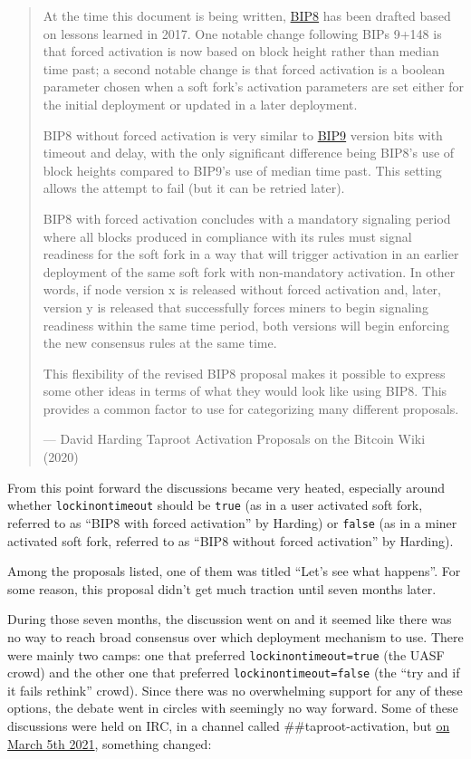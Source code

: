 \begin{quote}
At the time this document is being written,
\href{https://github.com/bitcoin/bips/blob/master/bip-0008.mediawiki}{BIP8}
has been drafted based on lessons learned in 2017. One notable change
following BIPs 9+148 is that forced activation is now based on block
height rather than median time past; a second notable change is that
forced activation is a boolean parameter chosen when a soft fork's
activation parameters are set either for the initial deployment or
updated in a later deployment.

BIP8 without forced activation is very similar to
\href{https://github.com/bitcoin/bips/blob/master/bip-0009.mediawiki}{BIP9}
version bits with timeout and delay, with the only significant
difference being BIP8's use of block heights compared to BIP9's use of
median time past. This setting allows the attempt to fail (but it can be
retried later).

BIP8 with forced activation concludes with a mandatory signaling period
where all blocks produced in compliance with its rules must signal
readiness for the soft fork in a way that will trigger activation in an
earlier deployment of the same soft fork with non-mandatory activation.
In other words, if node version x is released without forced activation
and, later, version y is released that successfully forces miners to
begin signaling readiness within the same time period, both versions
will begin enforcing the new consensus rules at the same time.

This flexibility of the revised BIP8 proposal makes it possible to
express some other ideas in terms of what they would look like using
BIP8. This provides a common factor to use for categorizing many
different proposals.

---  David Harding Taproot Activation Proposals on the Bitcoin Wiki
(2020)
\end{quote}

From this point forward the discussions became very heated, especially
around whether \texttt{lockinontimeout} should be \texttt{true} (as in a
user activated soft fork, referred to as ``BIP8 with forced activation''
by Harding) or \texttt{false} (as in a miner activated soft fork,
referred to as ``BIP8 without forced activation'' by Harding).

Among the proposals listed, one of them was titled ``Let's see what
happens''. For some reason, this proposal didn't get much traction until
seven months later.

During those seven months, the discussion went on and it seemed like
there was no way to reach broad consensus over which deployment
mechanism to use. There were mainly two camps: one that preferred
\texttt{lockinontimeout=true} (the UASF crowd) and the other one that
preferred \texttt{lockinontimeout=false} (the ``try and if it fails
rethink'' crowd). Since there was no overwhelming support for any of
these options, the debate went in circles with seemingly no way forward.
Some of these discussions were held on IRC, in a channel called
\#\#taproot-activation, but
\href{https://gnusha.org/taproot-activation/2021-03-05.log}{on March 5th
2021}, something changed:

